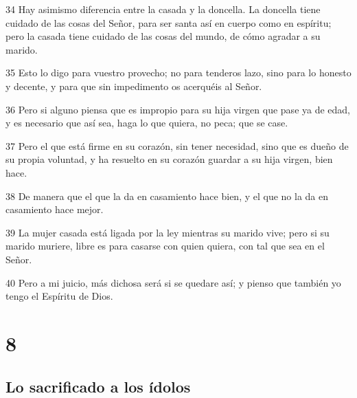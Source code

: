 \par 34 Hay asimismo diferencia entre la casada y la doncella. La doncella tiene cuidado de las cosas del Señor, para ser santa así en cuerpo como en espíritu; pero la casada tiene cuidado de las cosas del mundo, de cómo agradar a su marido.
\par 35 Esto lo digo para vuestro provecho; no para tenderos lazo, sino para lo honesto y decente, y para que sin impedimento os acerquéis al Señor.
\par 36 Pero si alguno piensa que es impropio para su hija virgen que pase ya de edad, y es necesario que así sea, haga lo que quiera, no peca; que se case.
\par 37 Pero el que está firme en su corazón, sin tener necesidad, sino que es dueño de su propia voluntad, y ha resuelto en su corazón guardar a su hija virgen, bien hace.
\par 38 De manera que el que la da en casamiento hace bien, y el que no la da en casamiento hace mejor.
\par 39 La mujer casada está ligada por la ley mientras su marido vive; pero si su marido muriere, libre es para casarse con quien quiera, con tal que sea en el Señor.
\par 40 Pero a mi juicio, más dichosa será si se quedare así; y pienso que también yo tengo el Espíritu de Dios.

\chapter{8}

\section*{Lo sacrificado a los ídolos}


